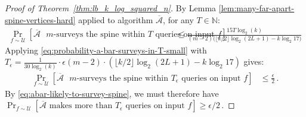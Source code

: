 \documentclass[11pt]{article}
\begin{document}
\begin{proof}[Proof of Theorem~\ref{thm:lb_k_log_squared_n}]
%
\vspace{-2mm}
By Lemma \ref{lem:many-far-apart-spine-vertices-hard} applied to algorithm $\overline{\mathcal{A}}$, for any $T \in \mathbb{N}$:
\begin{align}
    \Pr_{f \sim \mathcal{U}} \left[ \text{$\overline{\mathcal{A}}$ $m$-surveys the spine within $T$ queries on input $f$}\right] &\leq \frac{15 T \log_2(k)}{\left(m -2\right) \bigl(\lfloor k/2 \rfloor \log_2 (2L + 1) - k \log_2{17}\bigr)}  \label{eq:probability-a-bar-surveys-in-T-small}
\end{align}
Applying  \eqref{eq:probability-a-bar-surveys-in-T-small} with $ T_{\epsilon} = \frac{1}{30 \log_2(k)} \cdot  {\epsilon \left(m-2\right) \cdot \left(\lfloor k/2 \rfloor \log_2 (2L + 1) - k \log_2{17}\right)}$  gives:
\begin{align}
    \Pr_{f \sim \mathcal{U}} \left[ \text{$\overline{\mathcal{A}}$ $m$-surveys the spine within $T_{\epsilon}$ queries on input $f$}\right] &\leq \frac{\epsilon}{2} \,. 
\end{align}
By \eqref{eq:abar-likely-to-survey-spine}, we must therefore have $\Pr_{f \sim \mathcal{U}} \left[ \text{$\overline{\mathcal{A}}$ makes more than $T_{\epsilon}$ queries on input $f$}\right] \geq {\epsilon}/{2} \,.$


\end{proof}
\end{document}
